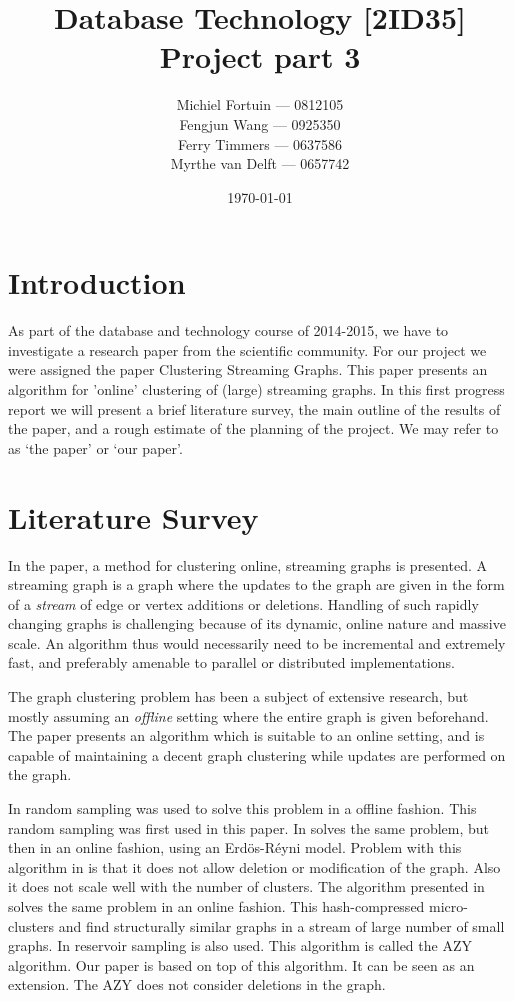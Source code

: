 \documentclass[a4paper,11pt]{article}
\title{Database Technology [2ID35] \\
\textbf{Project part 3}}
\author{
Michiel Fortuin --- 0812105 \\
Fengjun Wang --- 0925350 \\
Ferry Timmers --- 0637586 \\
Myrthe van Delft --- 0657742}
\date{\today}
\begin{document}
\newcommand{\papername}[0]{Clustering Streaming Graphs}

\maketitle

\section{Introduction}
As part of the database and technology course of 2014-2015, we have to investigate a research paper from the scientific community. For our project we were assigned the paper \papername \cite{paper}. This paper presents an algorithm for 'online' clustering of (large) streaming graphs. In this first progress report we will present a brief literature survey, the main outline of the results of the paper, and a rough estimate of the planning of the project. We may refer to \cite{paper} as `the paper' or `our paper'.

\section{Literature Survey}
In the paper, a method for clustering online, streaming graphs is presented. A streaming graph is a graph where the updates to the graph are given in the form of a \textit{stream} of edge or vertex additions or deletions. Handling of such rapidly changing graphs is challenging because of its dynamic, online nature and massive scale. An algorithm thus would necessarily need to be incremental and extremely fast, and preferably amenable to parallel or distributed implementations. 

The graph clustering problem has been a subject of extensive research, but mostly assuming an \textit{offline} setting where the entire graph is given beforehand. The paper presents an algorithm which is suitable to an online setting, and is capable of maintaining a decent graph clustering while updates are performed on the graph. 

In \cite{11} random sampling was used to solve this problem in a offline fashion. This random sampling was first used in this paper. In \cite{12} solves the same problem, but then in an online fashion, using an Erdös-Réyni model. Problem with this algorithm in \cite{12} is that it does not allow deletion or modification of the graph. Also it does not scale well with the number of clusters. The algorithm presented in  \cite{13} solves the same problem in an online fashion. This hash-compressed micro-clusters and find structurally similar graphs in a stream of large number of small graphs. In \cite{14} reservoir sampling is also used. This algorithm is called the AZY algorithm. Our paper is based on top of this algorithm. It can be seen as an extension. The AZY does not consider deletions in the graph.
\end{document}
